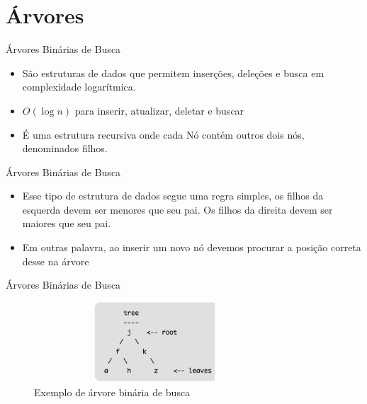 \section{Árvores}

\begin{frame}
	\begin{block}{Árvores Binárias de Busca}
		\begin{itemize}
			\item São estruturas de dados que permitem inserções, deleções e busca em complexidade logarítmica. 

			\item $O(\log n)$ para inserir, atualizar, deletar e buscar	
			
			\item É uma estrutura recursiva onde cada Nó contém outros dois nós, denominados filhos.

		\end{itemize}
	\end{block}
\end{frame}

\begin{frame}
	\begin{block}{Árvores Binárias de Busca}
		\begin{itemize}
			\item Esse tipo de estrutura de dados segue uma regra simples, os filhos da esquerda devem ser menores que seu pai. Os filhos da direita devem ser maiores que seu pai.

			\item Em outras palavra, ao inserir um novo nó devemos procurar a posição correta desse na árvore
		\end{itemize}
	\end{block}
\end{frame}

\begin{frame}
	\begin{block}{Árvores Binárias de Busca}
		\begin{figure}[!htb]
			\centering	  				
			\includegraphics[height=3cm, width = 9cm]{./pic/arvoreCompletaComun.png}
			\caption{Exemplo de árvore binária de busca \cite{GEEKS_2018}}
		\end{figure}
	\end{block}
\end{frame}


